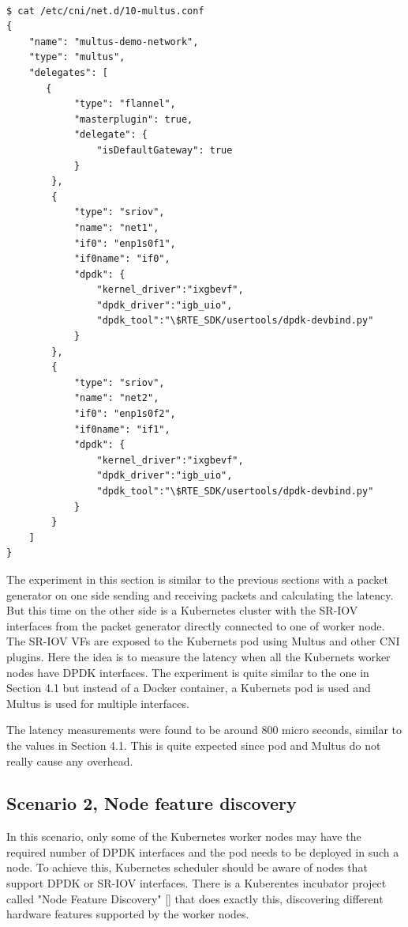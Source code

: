 \documentclass[english, 12pt, a4paper, elec, utf8, a-1b, online]{aaltothesis}
\begin{document}
\begin{lstlisting}[basicstyle={\small\ttfamily}]

$ cat /etc/cni/net.d/10-multus.conf
{
    "name": "multus-demo-network",
    "type": "multus",
    "delegates": [
       {
            "type": "flannel",
            "masterplugin": true,
            "delegate": {
                "isDefaultGateway": true
            }
        },
        {
            "type": "sriov",
            "name": "net1",
            "if0": "enp1s0f1",
            "if0name": "if0",
            "dpdk": {
                "kernel_driver":"ixgbevf",
                "dpdk_driver":"igb_uio",
                "dpdk_tool":"\$RTE_SDK/usertools/dpdk-devbind.py"
            }
        },
        {
            "type": "sriov",
            "name": "net2",
            "if0": "enp1s0f2",
            "if0name": "if1",
            "dpdk": {
                "kernel_driver":"ixgbevf",
                "dpdk_driver":"igb_uio",
                "dpdk_tool":"\$RTE_SDK/usertools/dpdk-devbind.py"
            }
        }
    ]
}

\end{lstlisting}

The experiment in this section is similar to the previous sections with a packet generator on one side sending and receiving packets and calculating the latency. But this time on the other side is a Kubernetes cluster with the SR-IOV interfaces from the packet generator directly connected to one of worker node. The SR-IOV VFs are exposed to the Kubernets pod using Multus and other CNI plugins. Here the idea is to measure the latency when all the Kubernets worker nodes have DPDK interfaces. The experiment is quite similar to the one in Section 4.1 but instead of a Docker container, a Kubernets pod is used and Multus is used for multiple interfaces.

The latency measurements were found to be around 800 micro seconds, similar to the values in Section 4.1. This is quite expected since pod and Multus do not really cause any overhead.

\subsection{Scenario 2, Node feature discovery}
In this scenario, only some of the Kubernetes worker nodes may have the required number of DPDK interfaces and the pod needs to be deployed in such a node. To achieve this, Kubernetes scheduler should be aware of nodes that support DPDK or SR-IOV interfaces. There is a Kuberentes incubator project called "Node Feature Discovery" [] that does exactly this, discovering different hardware features supported by the worker nodes.
\end{document}
